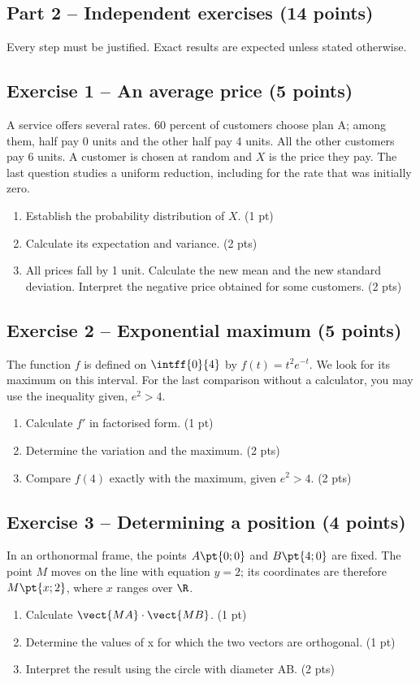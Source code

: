 \mxnewpage\subsection*{Part 2 -- Independent exercises (14 points)}
Every step must be justified. Exact results are expected unless stated otherwise.
\subsection*{Exercise 1 -- An average price (5 points)}
A service offers several rates. 60 percent of customers choose plan A; among them, half pay 0 units and the other half pay 4 units. All the other customers pay 6 units. A customer is chosen at random and $X$ is the price they pay. The last question studies a uniform reduction, including for the rate that was initially zero.
\begin{enumerate}
\item Establish the probability distribution of $X$. \hfill(1 pt)
\item Calculate its expectation and variance. \hfill(2 pts)
\item All prices fall by 1 unit. Calculate the new mean and the new standard deviation. Interpret the negative price obtained for some customers. \hfill(2 pts)
\end{enumerate}
\subsection*{Exercise 2 -- Exponential maximum (5 points)}
The function $f$ is defined on $\intff{0}{4}$ by $f(t)=t^2e^{-t}$. We look for its maximum on this interval. For the last comparison without a calculator, you may use the inequality given, $e^2>4$.
\begin{enumerate}
\item Calculate $f\prime$ in factorised form. \hfill(1 pt)
\item Determine the variation and the maximum. \hfill(2 pts)
\item Compare $f(4)$ exactly with the maximum, given $e^2>4$. \hfill(2 pts)
\end{enumerate}
\subsection*{Exercise 3 -- Determining a position (4 points)}
In an orthonormal frame, the points $A\pt{0;0}$ and $B\pt{4;0}$ are fixed. The point $M$ moves on the line with equation $y=2$; its coordinates are therefore $M\pt{x;2}$, where $x$ ranges over $\R$.
\begin{enumerate}
\item Calculate $\vect{MA}\cdot\vect{MB}$. \hfill(1 pt)
\item Determine the values of x for which the two vectors are orthogonal. \hfill(1 pt)
\item Interpret the result using the circle with diameter AB. \hfill(2 pts)
\end{enumerate}
